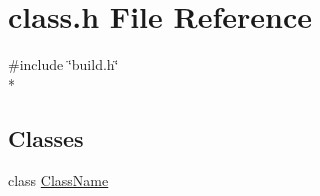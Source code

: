 \section{class.\-h File Reference}
\label{class_8h}
{\ttfamily \#include \char`\"{}build.\-h\char`\"{}}\\*
\subsection*{Classes}
\begin{DoxyCompactItemize}
\item 
class \hyperlink{class_class_name}{Class\-Name}
\end{DoxyCompactItemize}
